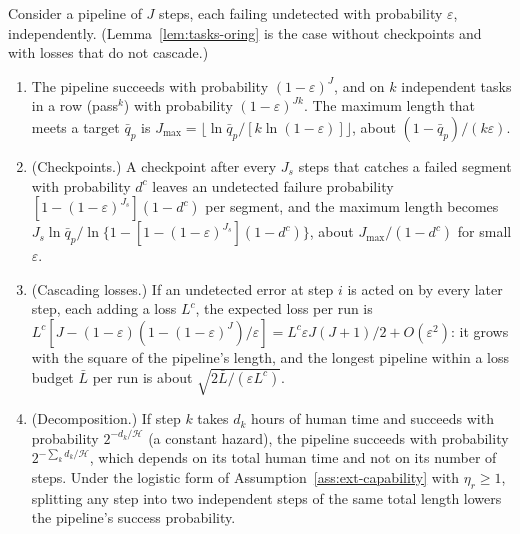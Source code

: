 \begin{proposition}\label{prop:tasks-pipeline}
Consider a pipeline of $J$ steps, each failing undetected with probability $\varepsilon$, independently. (Lemma~\ref{lem:tasks-oring} is the case without checkpoints and with losses that do not cascade.)
\begin{enumerate}
\item[(a)] The pipeline succeeds with probability $(1-\varepsilon)^J$, and on $k$ independent tasks in a row (pass$^k$) with probability $(1-\varepsilon)^{Jk}$. The maximum length that meets a target $\bar q_p$ is $J_{\max}=\lfloor\ln\bar q_p/[k\ln(1-\varepsilon)]\rfloor$, about $(1-\bar q_p)/(k\varepsilon)$.
\item[(b)] (Checkpoints.) A checkpoint after every $J_s$ steps that catches a failed segment with probability $d^c$ leaves an undetected failure probability $[1-(1-\varepsilon)^{J_s}](1-d^c)$ per segment, and the maximum length becomes $J_s\ln\bar q_p/\ln\{1-[1-(1-\varepsilon)^{J_s}](1-d^c)\}$, about $J_{\max}/(1-d^c)$ for small $\varepsilon$.
\item[(c)] (Cascading losses.) If an undetected error at step $i$ is acted on by every later step, each adding a loss $L^c$, the expected loss per run is $L^c[J-(1-\varepsilon)(1-(1-\varepsilon)^J)/\varepsilon]=L^c\varepsilon J(J+1)/2+O(\varepsilon^2)$: it grows with the square of the pipeline's length, and the longest pipeline within a loss budget $\bar L$ per run is about $\sqrt{2\bar L/(\varepsilon L^c)}$.
\item[(d)] (Decomposition.) If step $k$ takes $d_k$ hours of human time and succeeds with probability $2^{-d_k/\mathcal H}$ (a constant hazard), the pipeline succeeds with probability $2^{-\sum_kd_k/\mathcal H}$, which depends on its total human time and not on its number of steps. Under the logistic form of Assumption~\ref{ass:ext-capability} with $\eta_r\ge 1$, splitting any step into two independent steps of the same total length lowers the pipeline's success probability.
\end{enumerate}
\end{proposition}

